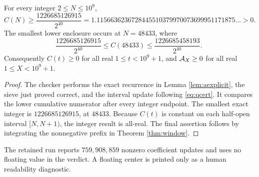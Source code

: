 \begin{theorem}\label{thm:billion}
For every integer $2\le N\le10^9$,
\begin{equation}\label{eq:minbound}
 C(N)\ge\frac{1226685126915}{2^{40}}
 =1.1156636236728445510379970073699951171875\ldots>0.
\end{equation}
The smallest lower enclosure occurs at $N=48433$, where
\begin{equation}\label{eq:mininterval}
 \frac{1226685126915}{2^{40}}
 \le C(48433)\le
 \frac{1226685458193}{2^{40}}.
\end{equation}
Consequently $C(t)\ge0$ for all real $1\le t<10^9+1$, and
$\mathcal A_X\ge0$ for all real $1\le X<10^9+1$.
\end{theorem}
\begin{proof}
The checker performs the exact recurrence in Lemma \ref{lem:aexplicit}, the
sieve just proved correct, and the interval update following
\eqref{eq:qcert}.  It compares the lower cumulative numerator after every
integer endpoint.  The smallest exact integer is $1226685126915$, at $48433$.
Because $C(t)$ is constant on each half-open interval $[N,N+1)$, the integer
result is all-real.  The final assertion follows by integrating the
nonnegative prefix in Theorem \ref{thm:window}.
\end{proof}

The retained run reports $759,908,859$ nonzero coefficient updates and uses no
floating value in the verdict.  A floating center is printed only as a human
readability diagnostic.

